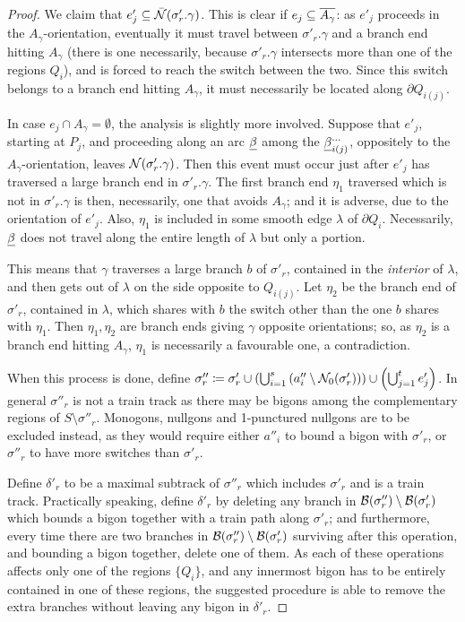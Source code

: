 \begin{proof}
We claim that $e'_j\subseteq\bar{{\mathcal N}}(\sigma'_r.\gamma)$. This is clear if $e_j\subseteq\overline{A_\gamma}$: as $e'_j$ proceeds in the $A_\gamma$-orientation, eventually it must travel between $\sigma'_r.\gamma$ and a branch end hitting $A_\gamma$ (there is one necessarily, because $\sigma'_r.\gamma$ intersects more than one of the regions $Q_i$), and is forced to reach the switch between the two. Since this switch belongs to a branch end hitting $A_\gamma$, it must necessarily be located along $\partial Q_{i(j)}$.

In case $e_j\cap A_\gamma=\emptyset$, the analysis is slightly more involved. Suppose that $e'_j$, starting at $P_j$, and proceeding along an arc $\underline{\beta}$ among the $\underline{\beta}_{i(j)}^{\ldots}$, oppositely to the $A_\gamma$-orientation, leaves ${\mathcal N}(\sigma'_r.\gamma)$. Then this event must occur just after $e'_j$ has traversed a large branch end in $\sigma'_r.\gamma$. The first branch end $\eta_1$ traversed which is not in $\sigma'_r.\gamma$ is then, necessarily, one that avoids $A_\gamma$; and it is adverse, due to the orientation of $e'_j$. Also, $\eta_1$ is included in some smooth edge $\lambda$ of $\partial Q_i$. Necessarily, $\underline{\beta}$ does not travel along the entire length of $\lambda$ but only a portion.

This means that $\gamma$ traverses a large branch $b$ of $\sigma'_r$, contained in the \emph{interior} of $\lambda$, and then gets out of $\lambda$ on the side opposite to $Q_{i(j)}$. Let $\eta_2$ be the branch end of $\sigma'_r$, contained in $\lambda$, which shares with $b$ the switch other than the one $b$ shares with $\eta_1$. Then $\eta_1,\eta_2$ are branch ends giving $\gamma$ opposite orientations; so, as $\eta_2$ is a branch end hitting $A_\gamma$, $\eta_1$ is necessarily a favourable one, a contradiction.

When this process is done, define $\sigma''_r\coloneqq \sigma'_r\cup \left(\bigcup_{i=1}^s \left(a''_i\setminus {\mathcal N}_0(\sigma'_r)\right)\right)\cup\left(\bigcup_{j=1}^t e'_j\right)$. In general $\sigma''_r$ is not a train track as there may be bigons among the complementary regions of $S\setminus \sigma''_r$. Monogons, nullgons and 1-punctured nullgons are to be excluded instead, as they would require either $a''_i$ to bound a bigon with $\sigma'_r$, or $\sigma''_r$ to have more switches than $\sigma'_r$.

Define $\delta'_r$ to be a maximal subtrack of $\sigma''_r$ which includes $\sigma'_r$ and is a train track. Practically speaking, define $\delta'_r$ by deleting any branch in $\mathcal B(\sigma''_r)\setminus\mathcal B(\sigma'_r)$ which bounds a bigon together with a train path along $\sigma'_r$; and furthermore, every time there are two branches in $\mathcal B(\sigma''_r)\setminus\mathcal B(\sigma'_r)$ surviving after this operation, and bounding a bigon together, delete one of them. As each of these operations affects only one of the regions $\{Q_i\}$, and any innermost bigon has to be entirely contained in one of these regions, the suggested procedure is able to remove the extra branches without leaving any bigon in $\delta'_r$. 


\end{proof}
